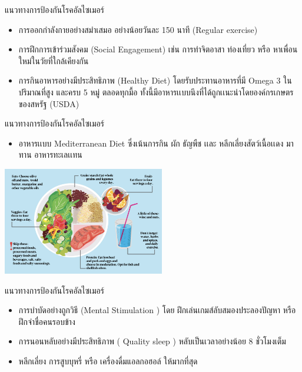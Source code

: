 \documentclass[xetex,serif]{beamer}
\begin{document}
\begin{frame}{แนวทางการป้องกันโรคอัลไซเมอร์}

\begin{itemize}
  \item การออกกําลังกายอย่างสมําเสมอ อย่างน้อยวันละ 150 นาที (Regular exercise) 
  \item การฝึกการเข้าร่วมสังคม (Social Engagement) เช่น การทําจิตอาสา ท่องเที่ยว หรือ หาเพื่อนใหม่ในวัยที่ใกล้เคียงกัน
  \item  การกินอาหารอย่างมีประสิทธิภาพ (Healthy Diet)  โดยรับประทานอาหารที่มี Omega 3 ในปริมาณที่สูง และครบ 5 หมู่ ตลอดทุกมื้อ ทั้งนี้มีอาหารเเบบนึงที่ได้ถูกเเนะนําโดยองค์กรเกษตรของสหรัฐ (USDA)
\end{itemize}

\end{frame}
\begin{frame}{แนวทางการป้องกันโรคอัลไซเมอร์}

\begin{itemize}
  \item อาหารเเบบ Mediterranean Diet ซึ่งเน้นการกิน ผัก ธัญพืช เเละ หลีกเลี่ยงสัตว์เนื้อเเดง มาทาน อาหารทะเลเเทน
\end{itemize}

\begin{center}
    \includegraphics[width=200pt]{file1.png}
\end{center}

\end{frame}
\begin{frame}{แนวทางการป้องกันโรคอัลไซเมอร์}

\begin{itemize}
  \item การบำบัดอย่างถูกวิธี (Mental Stimulation ) โดย ฝึกเล่นเกมส์ลับสมองประลองปัญหา หรือ ฝึกจําชื่อคนรอบข้าง
  \item การนอนหลับอย่างมีประสิทธิภาพ ( Quality sleep ) หลับเป็นเวลาอย่างน้อย 8 ชั่วโมงเต็ม
  \item หลีกเลี่ยง การสูบบุหรี่ หรือ เครื่องดื่มแอลกอฮอล์ ให้มากที่สุด
\end{itemize}

\end{frame}
\end{document}
